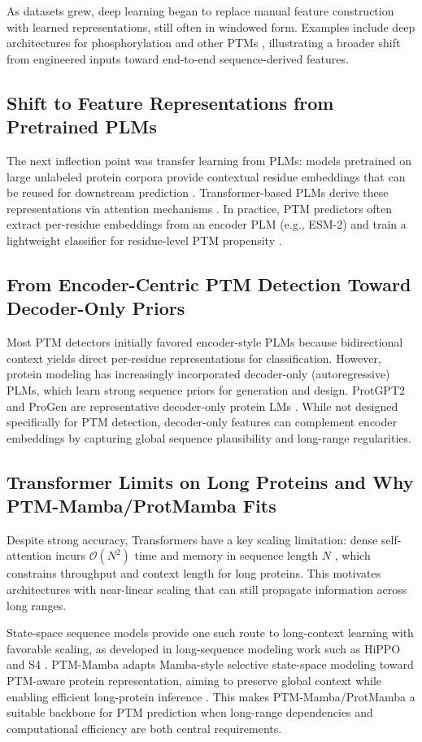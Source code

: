 \documentclass[conference]{IEEEtran}
\begin{document}
As datasets grew, deep learning began to replace manual feature construction with learned representations, still often in windowed form. Examples include deep architectures for phosphorylation and other PTMs \cite{wang2017musitedeep,fu2019deepubi}, illustrating a broader shift from engineered inputs toward end-to-end sequence-derived features.

\subsection{Shift to Feature Representations from Pretrained PLMs}
The next inflection point was transfer learning from PLMs: models pretrained on large unlabeled protein corpora provide contextual residue embeddings that can be reused for downstream prediction \cite{elnaggar2020,elnaggar2021prottranscrackinglanguagelifes}. Transformer-based PLMs derive these representations via attention mechanisms \cite{vaswani2017attention}. In practice, PTM predictors often extract per-residue embeddings from an encoder PLM (e.g., ESM-2) and train a lightweight classifier for residue-level PTM propensity \cite{lin2022,rives2021scaling}.

\subsection{From Encoder-Centric PTM Detection Toward Decoder-Only Priors}
Most PTM detectors initially favored encoder-style PLMs because bidirectional context yields direct per-residue representations for classification. However, protein modeling has increasingly incorporated decoder-only (autoregressive) PLMs, which learn strong sequence priors for generation and design. ProtGPT2 and ProGen are representative decoder-only protein LMs \cite{ferruz2022protgpt2,madani2020progen}. While not designed specifically for PTM detection, decoder-only features can complement encoder embeddings by capturing global sequence plausibility and long-range regularities.

\subsection{Transformer Limits on Long Proteins and Why PTM-Mamba/ProtMamba Fits}
Despite strong accuracy, Transformers have a key scaling limitation: dense self-attention incurs $\mathcal{O}(N^2)$ time and memory in sequence length $N$ \cite{vaswani2017attention}, which constrains throughput and context length for long proteins. This motivates architectures with near-linear scaling that can still propagate information across long ranges.

State-space sequence models provide one such route to long-context learning with favorable scaling, as developed in long-sequence modeling work such as HiPPO and S4 \cite{gu2020hippo,gu2022s4}. PTM-Mamba adapts Mamba-style selective state-space modeling toward PTM-aware protein representation, aiming to preserve global context while enabling efficient long-protein inference \cite{peng2024ptm}. This makes PTM-Mamba/ProtMamba a suitable backbone for PTM prediction when long-range dependencies and computational efficiency are both central requirements.



\end{document}
